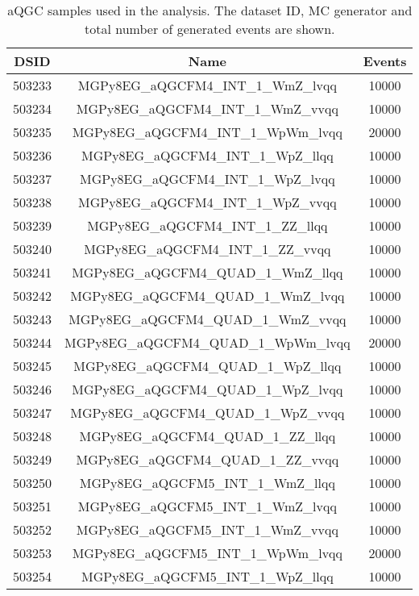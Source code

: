 \begin{table}[!htbp]
\begin{center}
\small
\caption{
aQGC samples used in the analysis. The dataset ID, MC generator and total number of generated events are shown.
}
\begin{tabular}{c|c|c}
\hline

\hline
DSID & Name & Events  \\
\hline

503233 & MGPy8EG\_aQGCFM4\_INT\_1\_WmZ\_lvqq     & 10000 \\
503234 & MGPy8EG\_aQGCFM4\_INT\_1\_WmZ\_vvqq     & 10000 \\
503235 & MGPy8EG\_aQGCFM4\_INT\_1\_WpWm\_lvqq    & 20000 \\
503236 & MGPy8EG\_aQGCFM4\_INT\_1\_WpZ\_llqq     & 10000 \\
503237 & MGPy8EG\_aQGCFM4\_INT\_1\_WpZ\_lvqq     & 10000 \\
503238 & MGPy8EG\_aQGCFM4\_INT\_1\_WpZ\_vvqq     & 10000 \\
503239 & MGPy8EG\_aQGCFM4\_INT\_1\_ZZ\_llqq      & 10000 \\
503240 & MGPy8EG\_aQGCFM4\_INT\_1\_ZZ\_vvqq      & 10000 \\
503241 & MGPy8EG\_aQGCFM4\_QUAD\_1\_WmZ\_llqq    & 10000 \\
503242 & MGPy8EG\_aQGCFM4\_QUAD\_1\_WmZ\_lvqq    & 10000 \\
503243 & MGPy8EG\_aQGCFM4\_QUAD\_1\_WmZ\_vvqq    & 10000 \\
503244 & MGPy8EG\_aQGCFM4\_QUAD\_1\_WpWm\_lvqq   & 20000 \\
503245 & MGPy8EG\_aQGCFM4\_QUAD\_1\_WpZ\_llqq    & 10000 \\
503246 & MGPy8EG\_aQGCFM4\_QUAD\_1\_WpZ\_lvqq    & 10000 \\
503247 & MGPy8EG\_aQGCFM4\_QUAD\_1\_WpZ\_vvqq    & 10000 \\
503248 & MGPy8EG\_aQGCFM4\_QUAD\_1\_ZZ\_llqq     & 10000 \\
503249 & MGPy8EG\_aQGCFM4\_QUAD\_1\_ZZ\_vvqq     & 10000 \\
503250 & MGPy8EG\_aQGCFM5\_INT\_1\_WmZ\_llqq     & 10000 \\
503251 & MGPy8EG\_aQGCFM5\_INT\_1\_WmZ\_lvqq     & 10000 \\
503252 & MGPy8EG\_aQGCFM5\_INT\_1\_WmZ\_vvqq     & 10000 \\
503253 & MGPy8EG\_aQGCFM5\_INT\_1\_WpWm\_lvqq    & 20000 \\
503254 & MGPy8EG\_aQGCFM5\_INT\_1\_WpZ\_llqq     & 10000 \\

\end{tabular}
\end{center}
\end{table}
